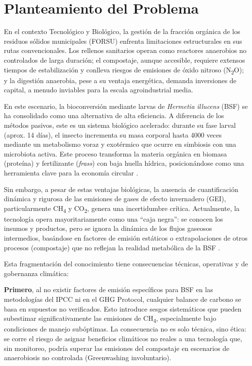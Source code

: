 \chapter{Planteamiento del Problema}

En el contexto Tecnológico y Biológico, la gestión de la fracción orgánica de los residuos sólidos municipales (FORSU) enfrenta limitaciones estructurales en sus rutas convencionales. Los rellenos sanitarios operan como reactores anaerobios no controlados de larga duración; el compostaje, aunque accesible, requiere extensos tiempos de estabilización y conlleva riesgos de emisiones de óxido nitroso (N\textsubscript{2}O); y la digestión anaerobia, pese a su ventaja energética, demanda inversiones de capital, a menudo inviables para la escala agroindustrial media.

En este escenario, la bioconversión mediante larvas de \textit{Hermetia illucens} (BSF) se ha consolidado como una alternativa de alta eficiencia. A diferencia de los métodos pasivos, este es un sistema biológico acelerado: durante su fase larval (aprox. 14 días), el insecto incrementa su masa corporal hasta 4000 veces mediante un metabolismo voraz y exotérmico que ocurre en simbiosis con una microbiota activa. Este proceso transforma la materia orgánica en biomasa (proteína) y fertilizante (\textit{frass}) con baja huella hídrica, posicionándose como una herramienta clave para la economía circular \parencite{surendraBioconversionOrganicWastes2016,bermudez-serranoComprehensiveUtilizationBlack2023}.

Sin embargo, a pesar de estas ventajas biológicas, la ausencia de cuantificación dinámica y rigurosa de las emisiones de gases de efecto invernadero (GEI), particularmente CH\textsubscript{4} y CO\textsubscript{2}, genera una incertidumbre crítica. Actualmente, la tecnología opera mayoritariamente como una ``caja negra'': se conocen los insumos y productos, pero se ignora la dinámica de los flujos gaseosos intermedios, basándose en factores de emisión estáticos o extrapolaciones de otros procesos (compostaje) que no reflejan la realidad metabólica de la BSF \parencite{fuhrmannComprehensiveIndustryrelevantBlack2025a,rossiEstimatingDynamicsGreenhouse2024a}. 

Esta fragmentación del conocimiento tiene consecuencias técnicas, operativas y de gobernanza climática:

\textbf{Primero}, al no existir factores de emisión específicos para BSF en las metodologías del IPCC ni en el GHG Protocol, cualquier balance de carbono se basa en supuestos no verificados. Esto introduce sesgos sistemáticos que pueden subestimar significativamente las emisiones de CH\textsubscript{4}, especialmente bajo condiciones de manejo subóptimas. La consecuencia no es solo técnica, sino ética: se corre el riesgo de asignar beneficios climáticos no reales a una tecnología que, sin monitoreo, podría superar las emisiones del compostaje en escenarios de anaerobiosis no controlada (Greenwashing involuntario).

